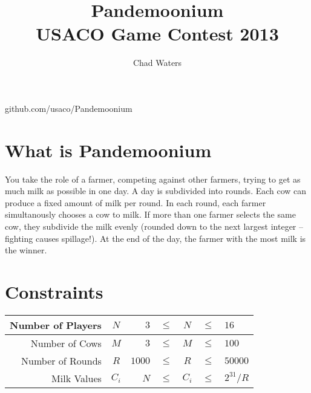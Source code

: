 \documentclass[11pt]{article}
\title{\textbf{Pandemoonium}\\USACO Game Contest 2013}
\author{Chad Waters}
\date{}
\begin{document}
\maketitle

\begin{center}
github.com/usaco/Pandemoonium
\end{center}

\section{What is Pandemoonium}

You take the role of a farmer, competing against other farmers, trying to get as much milk as possible in one day. A day is subdivided into rounds. Each cow can produce a fixed amount of milk per round. In each round, each farmer simultanously chooses a cow to milk. If more than one farmer selects the same cow, they subdivide the milk evenly (rounded down to the next largest integer -- fighting causes spillage!). At the end of the day, the farmer with the most milk is the winner.

\section{Constraints}

\begin{center}
\def\arraystretch{1.3}
\begin{tabular}{r|c|rcccl}
Number of Players & $N$ & $3$ & $\le$ & $N$ & $\le$ & $16$ \\
\hline
Number of Cows & $M$ & $3$ & $\le$ & $M$ & $\le$ & $100$ \\
\hline
Number of Rounds & $R$ & $1000$ & $\le$ & $R$ & $\le$ & $50000$ \\
\hline
Milk Values & $C_i$ & $N$ & $\le$ & $C_i$ & $\le$ & $2^{31}/R$ \\
\end{tabular}
\end{center}
\end{document}
